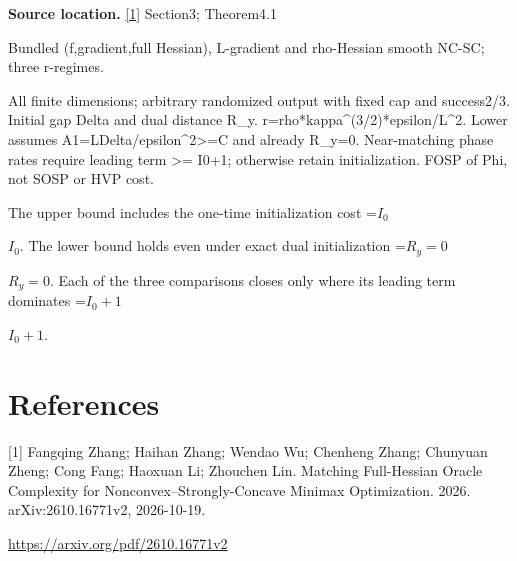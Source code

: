 \documentclass[10pt,a4paper]{article}
\newcommand{\AtlasMath}[1]{\par\begingroup\centering\setbox0=\hbox{$\displaystyle #1$}\ifdim\wd0>1.4\linewidth\typeout{ATLAS WIDE FORMULA: \the\wd0}\fi\ifdim\wd0>\linewidth\resizebox{\linewidth}{!}{\box0}\else\box0\fi\par\endgroup}
\newcommand{\AtlasInlineMath}[1]{\begingroup\setbox0=\hbox{$#1$}\ifdim\wd0>.4\linewidth\endgroup\AtlasMath{#1}\else\endgroup$#1$\fi}
\begin{document}
\textbf{Source location.} \href{https://arxiv.org/pdf/2610.16771v2}{[1]} Section3; Theorem4.1

Bundled (f,gradient,full Hessian), L-gradient and rho-Hessian smooth NC-SC; three r-regimes.

All finite dimensions; arbitrary randomized output with fixed cap and success2/3. Initial gap Delta and dual distance R\_y. r=rho*kappa\textasciicircum{}(3/2)*epsilon/L\textasciicircum{}2. Lower assumes A1=LDelta/epsilon\textasciicircum{}2>=C and already R\_y=0. Near-matching phase rates require leading term >= I0+1; otherwise retain initialization. FOSP of Phi, not SOSP or HVP cost.

The upper bound includes the one-time initialization cost \AtlasInlineMath{I_0}. The lower bound holds even under exact dual initialization \AtlasInlineMath{R_y=0}. Each of the three comparisons closes only where its leading term dominates \AtlasInlineMath{I_0+1}.

\section{References}
[1] Fangqing Zhang; Haihan Zhang; Wendao Wu; Chenheng Zhang; Chunyuan Zheng; Cong Fang; Haoxuan Li; Zhouchen Lin. Matching Full-Hessian Oracle Complexity for Nonconvex--Strongly-Concave Minimax Optimization. 2026. arXiv:2610.16771v2, 2026-10-19.

\url{https://arxiv.org/pdf/2610.16771v2}
\end{document}
